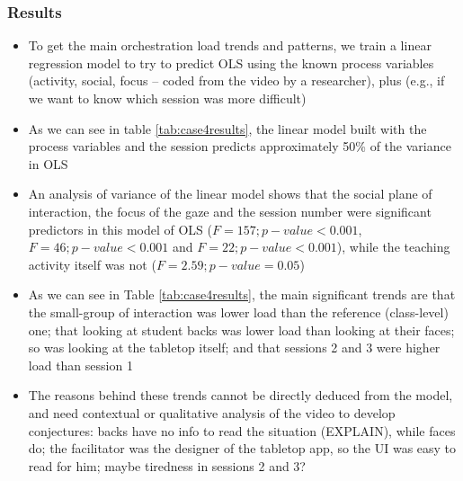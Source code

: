 \documentclass[10pt,journal,compsoc]{IEEEtran}
\begin{document}
\subsubsection{Results}

\begin{itemize}
\item To get the main orchestration load trends and patterns, we train a linear regression model to try to predict OLS using the known process variables (activity, social, focus -- coded from the video by a researcher), plus (e.g., if we want to know which session was more difficult)
\item As we can see in table \ref{tab:case4results}, the linear model built with the process variables and the session predicts approximately 50\% of the variance in OLS
\item An analysis of variance of the linear model shows that the social plane of interaction, the focus of the gaze and the session number were significant predictors in this model of OLS ($F=157; p-value<0.001$, $F=46; p-value<0.001$ and $F=22; p-value<0.001$), while the teaching activity itself was not ($F=2.59; p-value=0.05$)
\item As we can see in Table \ref{tab:case4results}, the main significant trends are that the small-group of interaction was lower load than the reference (class-level) one; that looking at student backs was lower load than looking at their faces; so was looking at the tabletop itself; and that sessions 2 and 3 were higher load than session 1
\item The reasons behind these trends cannot be directly deduced from the model, and need contextual or qualitative analysis of the video to develop conjectures: backs have no info to read the situation (EXPLAIN), while faces do; the facilitator was the designer of the tabletop app, so the UI was easy to read for him; maybe tiredness in sessions 2 and 3?
\end{itemize}
\end{document}
